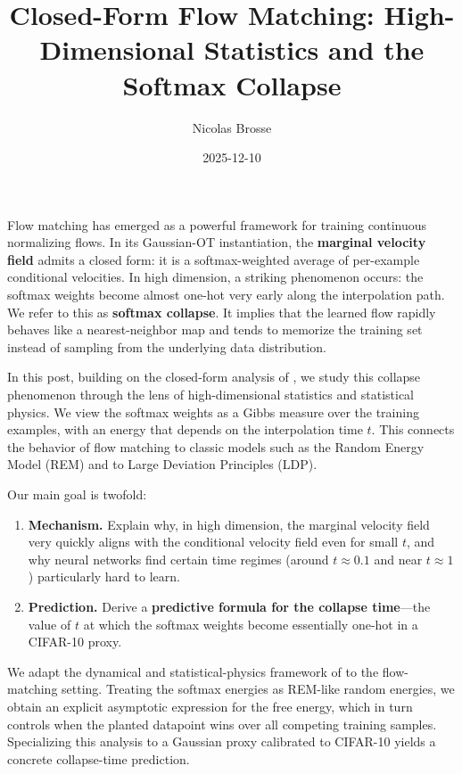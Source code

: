 \documentclass[11pt]{article}
\title{Closed-Form Flow Matching: High-Dimensional Statistics and the Softmax Collapse}
\author{Nicolas Brosse}
\date{2025-12-10}
\begin{document}
\maketitle
\tableofcontents

Flow matching has emerged as a powerful framework for training continuous normalizing flows. In its Gaussian-OT instantiation, the \textbf{marginal velocity field} admits a closed form: it is a softmax-weighted average of per-example conditional velocities. In high dimension, a striking phenomenon occurs: the softmax weights become almost one-hot very early along the interpolation path. We refer to this as \textbf{softmax collapse}. It implies that the learned flow rapidly behaves like a nearest-neighbor map and tends to memorize the training set instead of sampling from the underlying data distribution.

In this post, building on the closed-form analysis of \cite{bertrand_closed-form_2025}, we study this collapse phenomenon through the lens of high-dimensional statistics and statistical physics. We view the softmax weights as a Gibbs measure over the training examples, with an energy that depends on the interpolation time $t$. This connects the behavior of flow matching to classic models such as the Random Energy Model (REM) and to Large Deviation Principles (LDP).

Our main goal is twofold:
\begin{enumerate}
\item \textbf{Mechanism.} Explain why, in high dimension, the marginal velocity field very quickly aligns with the conditional velocity field even for small $t$, and why neural networks find certain time regimes (around $t \approx 0.1$ and near $t \approx 1$) particularly hard to learn.
\item \textbf{Prediction.} Derive a \textbf{predictive formula for the collapse time}---the value of $t$ at which the softmax weights become essentially one-hot in a CIFAR-10 proxy.
\end{enumerate}

We adapt the dynamical and statistical-physics framework of \cite{biroli_dynamical_2024} to the flow-matching setting. Treating the softmax energies as REM-like random energies, we obtain an explicit asymptotic expression for the free energy, which in turn controls when the planted datapoint wins over all competing training samples. Specializing this analysis to a Gaussian proxy calibrated to CIFAR-10 yields a concrete collapse-time prediction.
\end{document}
